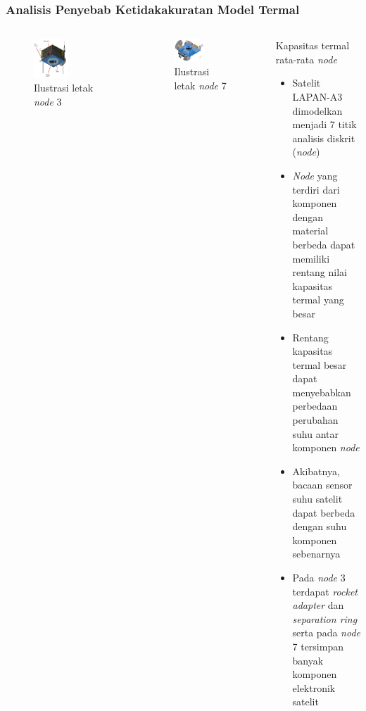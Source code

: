 \documentclass[8pt]{beamer}
\begin{document}
\begin{frame}
  \frametitle{Analisis Penyebab Ketidakakuratan Model Termal}
  \begin{columns}[T]
      \begin{figure}
          \includegraphics[width=0.5\textwidth]{figure/node3.png}
            \caption{Ilustrasi letak \textit{node} 3}
      \end{figure}
      \begin{figure}
          \includegraphics[width=0.5\textwidth]{figure/node7.png}
            \caption{Ilustrasi letak \textit{node} 7}
      \end{figure}
    \begin{block}{\center \normalsize Kapasitas termal rata-rata \textit{node}}
      \begin{itemize}
        \item Satelit LAPAN-A3 dimodelkan menjadi 7 titik analisis diskrit (\textit{node})
      \item \textit{Node} yang terdiri dari komponen dengan material berbeda dapat memiliki rentang nilai kapasitas termal yang besar
      \item Rentang kapasitas termal besar dapat menyebabkan perbedaan perubahan suhu antar komponen \textit{node}
      \item Akibatnya, bacaan sensor suhu satelit dapat berbeda dengan suhu komponen sebenarnya
      \item Pada \textit{node} 3 terdapat \textit{rocket adapter} dan \textit{separation ring} serta pada \textit{node} 7 tersimpan banyak komponen elektronik satelit
      \end{itemize}
    \end{block}
  \end{columns}
\end{frame}
\end{document}
